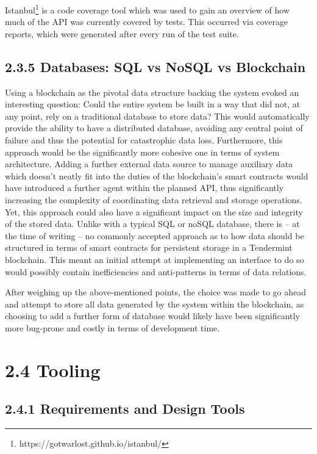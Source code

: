 Istanbul\footnote{https://gotwarlost.github.io/istanbul/} is a
code coverage tool which was used to gain an overview of how much of the
API was currently covered by tests. This occurred via coverage reports,
which were generated after every run of the test suite.

\subsection{2.3.5 Databases: SQL vs NoSQL vs
Blockchain}\label{databases-sql-vs-nosql-vs-blockchain}

Using a blockchain as the pivotal data structure backing the system
evoked an interesting question: Could the entire system be built in a
way that did not, at any point, rely on a traditional database to store
data? This would automatically provide the ability to have a distributed
database, avoiding any central point of failure and thus the potential
for catastrophic data loss. Furthermore, this approach would be the
significantly more cohesive one in terms of system architecture. Adding
a further external data source to manage auxiliary data which doesn't
neatly fit into the duties of the blockchain's smart contracts would
have introduced a further agent within the planned API, thus
significantly increasing the complexity of coordinating data retrieval
and storage operations.\\
Yet, this approach could also have a significant impact on the size and
integrity of the stored data. Unlike with a typical SQL or noSQL
database, there is -- at the time of writing -- no commonly accepted
approach as to how data should be structured in terms of smart contracts
for persistent storage in a Tendermint blockchain. This meant an initial
attempt at implementing an interface to do so would possibly contain
inefficiencies and anti-patterns in terms of data relations.

After weighing up the above-mentioned points, the choice was made to go
ahead and attempt to store all data generated by the system within the
blockchain, as choosing to add a further form of database would likely
have been significantly more bug-prone and costly in terms of
development time.

\section{2.4 Tooling}\label{tooling}

\subsection{2.4.1 Requirements and Design
Tools}\label{requirements-and-design-tools}

